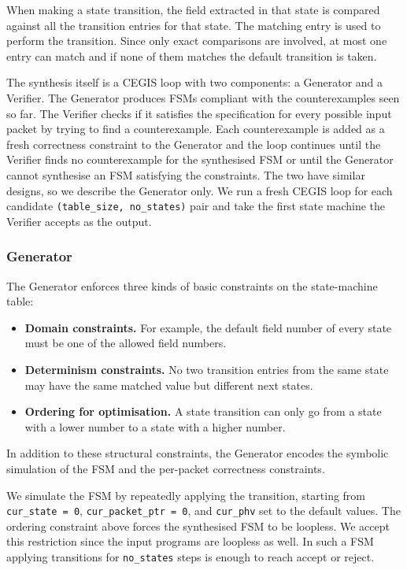 When making a state transition, the field extracted in that
state is compared against all the transition entries for that state. 
The matching entry is used to perform the transition. Since only
exact comparisons are involved, at most one entry can match and if none of them
matches the default transition is taken.

The synthesis itself is a CEGIS loop with two components: a
Generator and a Verifier. The Generator produces FSMs compliant with the
counterexamples seen so far. 
The Verifier checks if it satisfies the specification for
every possible input packet by trying to find a counterexample. 
Each counterexample is added as a fresh correctness
constraint to the Generator and the loop continues 
until the Verifier finds no
counterexample for the synthesised FSM or until the Generator cannot synthesise 
an FSM satisfying the constraints. 
The two have similar designs, so we describe the
Generator only. We run a fresh CEGIS loop for each candidate
\texttt{(table\_size, no\_states)} pair and take the first state
machine the Verifier accepts as the output.

\subsubsection*{Generator}

The Generator enforces three kinds of basic constraints on the state-machine
table:

\begin{itemize}
    \item \textbf{Domain constraints.} For example, the default field
    number of every state must be one of the allowed field numbers.

    \item \textbf{Determinism constraints.} No two transition entries
    from the same state may have the same matched value but different
    next states.

    \item \textbf{Ordering for optimisation.} A state transition can
    only go from a state with a lower number to a state with a higher
    number.
\end{itemize}

In addition to these structural constraints, the Generator encodes
the symbolic simulation of the FSM and the per-packet
correctness constraints.

We simulate the FSM by repeatedly applying the transition,
starting from \texttt{cur\_state = 0},
\texttt{cur\_packet\_ptr = 0}, and \texttt{cur\_phv} set to the
default values. The ordering constraint above forces the synthesised
FSM to be loopless. We accept this restriction since
the input programs are loopless as well. In such a FSM applying transitions
for \texttt{no\_states} steps is enough to reach accept or reject.

